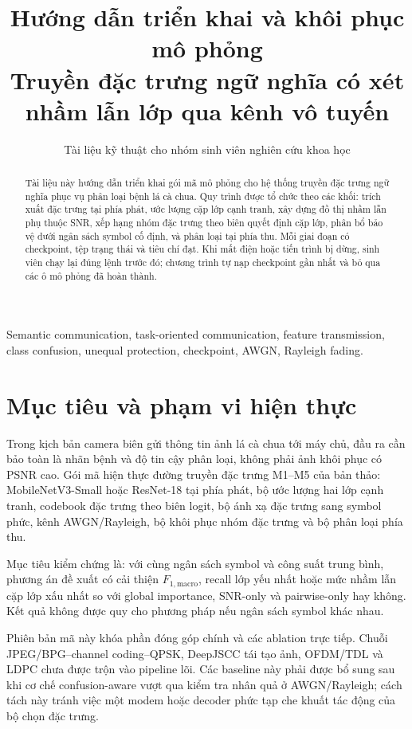 \documentclass[11pt,journal,onecolumn]{IEEEtran}
\title{Hướng dẫn triển khai và khôi phục mô phỏng\\
Truyền đặc trưng ngữ nghĩa có xét nhầm lẫn lớp qua kênh vô tuyến}
\author{Tài liệu kỹ thuật cho nhóm sinh viên nghiên cứu khoa học}
\newcommand{\fmacro}{F_{1,\mathrm{macro}}}
\begin{document}
\maketitle

\begin{abstract}
Tài liệu này hướng dẫn triển khai gói mã mô phỏng cho hệ thống truyền đặc trưng ngữ nghĩa phục vụ phân loại bệnh lá cà chua. Quy trình được tổ chức theo các khối: trích xuất đặc trưng tại phía phát, ước lượng cặp lớp cạnh tranh, xây dựng đồ thị nhầm lẫn phụ thuộc SNR, xếp hạng nhóm đặc trưng theo biên quyết định cặp lớp, phân bổ bảo vệ dưới ngân sách symbol cố định, và phân loại tại phía thu. Mỗi giai đoạn có checkpoint, tệp trạng thái và tiêu chí đạt. Khi mất điện hoặc tiến trình bị dừng, sinh viên chạy lại đúng lệnh trước đó; chương trình tự nạp checkpoint gần nhất và bỏ qua các ô mô phỏng đã hoàn thành.
\end{abstract}

\begin{IEEEkeywords}
Semantic communication, task-oriented communication, feature transmission, class confusion, unequal protection, checkpoint, AWGN, Rayleigh fading.
\end{IEEEkeywords}

\section{Mục tiêu và phạm vi hiện thực}
Trong kịch bản camera biên gửi thông tin ảnh lá cà chua tới máy chủ, đầu ra cần bảo toàn là nhãn bệnh và độ tin cậy phân loại, không phải ảnh khôi phục có PSNR cao. Gói mã hiện thực đường truyền đặc trưng M1--M5 của bản thảo: MobileNetV3-Small hoặc ResNet-18 tại phía phát, bộ ước lượng hai lớp cạnh tranh, codebook đặc trưng theo biên logit, bộ ánh xạ đặc trưng sang symbol phức, kênh AWGN/Rayleigh, bộ khôi phục nhóm đặc trưng và bộ phân loại phía thu.

Mục tiêu kiểm chứng là: với cùng ngân sách symbol và công suất trung bình, phương án đề xuất có cải thiện $\fmacro$, recall lớp yếu nhất hoặc mức nhầm lẫn cặp lớp xấu nhất so với global importance, SNR-only và pairwise-only hay không. Kết quả không được quy cho phương pháp nếu ngân sách symbol khác nhau.

Phiên bản mã này khóa phần đóng góp chính và các ablation trực tiếp. Chuỗi JPEG/BPG--channel coding--QPSK, DeepJSCC tái tạo ảnh, OFDM/TDL và LDPC chưa được trộn vào pipeline lõi. Các baseline này phải được bổ sung sau khi cơ chế confusion-aware vượt qua kiểm tra nhân quả ở AWGN/Rayleigh; cách tách này tránh việc một modem hoặc decoder phức tạp che khuất tác động của bộ chọn đặc trưng.
\end{document}
